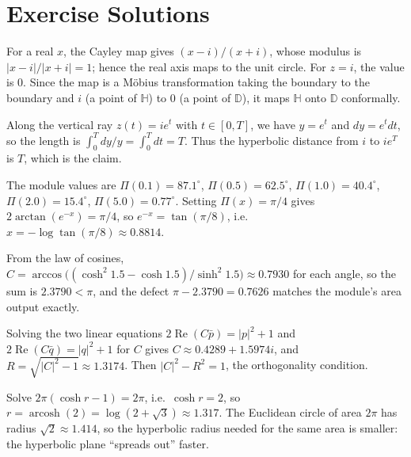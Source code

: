 \section{Exercise Solutions}

\begin{solution}
For a real $x$, the Cayley map gives $(x - i)/(x + i)$, whose modulus is $\lvert x - i \rvert / \lvert x + i \rvert = 1$; hence the real axis maps to the unit circle. For $z = i$, the value is $0$. Since the map is a M\"obius transformation taking the boundary to the boundary and $i$ (a point of $\mathbb{H}$) to $0$ (a point of $\mathbb{D}$), it maps $\mathbb{H}$ onto $\mathbb{D}$ conformally.
\end{solution}

\begin{solution}
Along the vertical ray $z(t) = i e^t$ with $t \in [0, T]$, we have $y = e^t$ and $dy = e^t dt$, so the length is $\int_0^T dy/y = \int_0^T dt = T$. Thus the hyperbolic distance from $i$ to $i e^T$ is $T$, which is the claim.
\end{solution}

\begin{solution}
The module values are $\Pi(0.1) = 87.1^\circ$, $\Pi(0.5) = 62.5^\circ$, $\Pi(1.0) = 40.4^\circ$, $\Pi(2.0) = 15.4^\circ$, $\Pi(5.0) = 0.77^\circ$. Setting $\Pi(x) = \pi/4$ gives $2\arctan(e^{-x}) = \pi/4$, so $e^{-x} = \tan(\pi/8)$, i.e.\ $x = -\log \tan(\pi/8) \approx 0.8814$.
\end{solution}

\begin{solution}
From the law of cosines, $C = \arccos\big((\cosh^2 1.5 - \cosh 1.5)/\sinh^2 1.5\big) \approx 0.7930$ for each angle, so the sum is $2.3790 < \pi$, and the defect $\pi - 2.3790 = 0.7626$ matches the module's area output exactly.
\end{solution}

\begin{solution}
Solving the two linear equations $2\operatorname{Re}(C \bar p) = \lvert p \rvert^2 + 1$ and $2\operatorname{Re}(C \bar q) = \lvert q \rvert^2 + 1$ for $C$ gives $C \approx 0.4289 + 1.5974i$, and $R = \sqrt{\lvert C \rvert^2 - 1} \approx 1.3174$. Then $\lvert C \rvert^2 - R^2 = 1$, the orthogonality condition.
\end{solution}

\begin{solution}
Solve $2\pi(\cosh r - 1) = 2\pi$, i.e.\ $\cosh r = 2$, so $r = \operatorname{arcosh}(2) = \log(2 + \sqrt{3}) \approx 1.317$. The Euclidean circle of area $2\pi$ has radius $\sqrt{2} \approx 1.414$, so the hyperbolic radius needed for the same area is smaller: the hyperbolic plane ``spreads out'' faster.
\end{solution}


